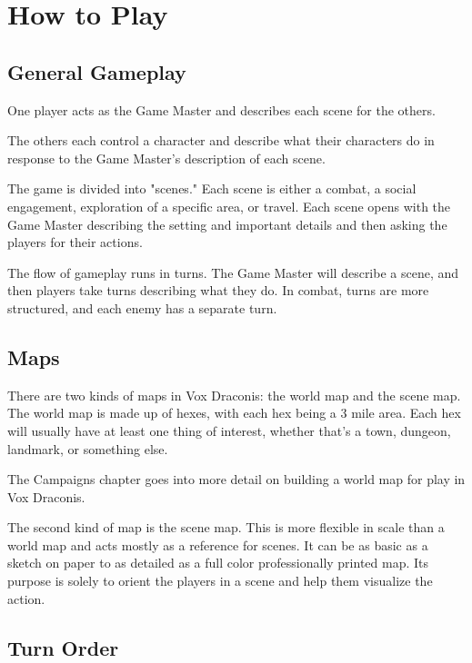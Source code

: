\chapter{How to Play}

\begin{multicols}{2}

\section{General Gameplay}

One player acts as the Game Master and describes each scene for the others.

The others each control a character and describe what their characters do
in response to the Game Master's description of each scene.

The game is divided into "scenes." Each scene is either a combat,
a social engagement, exploration of a specific area, or
travel. Each scene opens with the Game Master describing the setting
and important details and then asking the players for their actions.

The flow of gameplay runs in turns. The Game Master will
describe a scene, and then players take turns describing
what they do. In combat, turns are more structured, and each
enemy has a separate turn.

\section{Maps}

There are two kinds of maps in Vox Draconis: the world map and the
scene map. The world map is made up of hexes, with each hex being
a 3 mile area. Each hex will usually have at least one thing of
interest, whether that's a town, dungeon, landmark, or something else.

The Campaigns chapter goes into more detail on building a world map for
play in Vox Draconis.

The second kind of map is the scene map. This is more flexible in scale than
a world map and acts mostly as a reference for scenes. It can be as basic
as a sketch on paper to as detailed as a full color professionally printed map.
Its purpose is solely to orient the players in a scene and help them visualize
the action.

\section{Turn Order}


\end{multicols}
